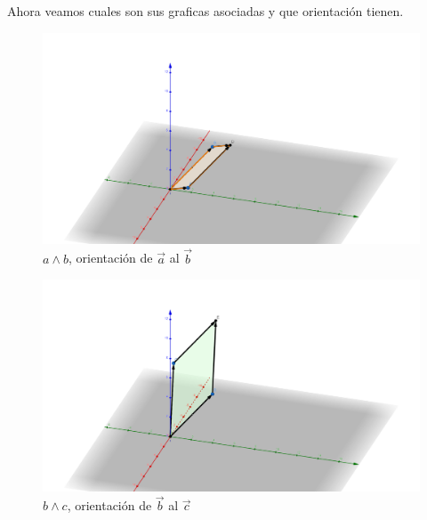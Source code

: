 \documentclass[letterpaper]{article}
\theoremstyle{definition}
\theoremstyle{lemathm}
\theoremstyle{lemademthm}
\begin{document}
\begin{enumerate}
		\newpage

		Ahora veamos cuales son sus graficas asociadas y que orientación tienen.

		\begin{figure}[H]
			\begin{center}
				\includegraphics[scale=.17]{a^b.png}
				\caption*{$a \wedge b$, orientación de $\vec{a}$ al $\vec{b}$}
			\end{center}
		\end{figure}

		\begin{figure}[H]
			\begin{center}
				\includegraphics[scale=.17]{b^c.png}
				\caption*{$b \wedge c$, orientación de $\vec{b}$ al $\vec{c}$}
			\end{center}
		\end{figure}


\end{enumerate}
\end{document}
